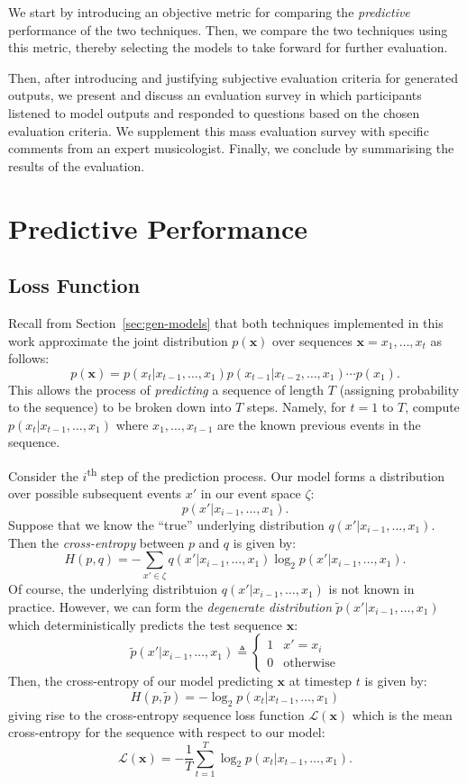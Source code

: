 \documentclass[12pt,a4paper,twoside,openright]{report}
\newcommand{\vect}[1]{\boldsymbol{\mathbf{#1}}}
\begin{document}
\vspace{4mm}

We start by introducing an objective metric for comparing the \emph{predictive}
performance of the two techniques. Then, we compare the two techniques using
this metric, thereby selecting the models to take forward for further
evaluation. 

Then, after introducing and justifying subjective evaluation criteria for
generated outputs, we present and discuss an evaluation survey in which
participants listened to model outputs and responded to questions based on the
chosen evaluation criteria. We supplement this mass evaluation survey with
specific comments from an expert musicologist. Finally, we conclude by
summarising the results of the evaluation.

\section{Predictive Performance}

\subsection{Loss Function}

Recall from Section~\ref{sec:gen-models} that both techniques implemented in
this work approximate the joint distribution $p(\vect{x})$ over sequences
$\vect{x} = x_1,\ldots,x_t$ as follows:
$$ p(\vect{x}) = p(x_t | x_{t-1}, \ldots, x_1) p(x_{t-1} | x_{t-2}, \ldots, x_1)
\cdots p(x_1). $$
This allows the process of \emph{predicting} a sequence of length $T$ (assigning
probability to the sequence) to be broken down into $T$ steps. Namely, for $t
= 1$ to $T$, compute $p(x_t | x_{t-1}, \ldots, x_1)$ where $x_1, \ldots,
x_{t-1}$ are the known previous events in the sequence. 

Consider the $i$\textsuperscript{th} step of the prediction process. Our model
forms a distribution over possible subsequent events $x'$ in our event space
$\zeta$:
$$ p(x' | x_{i-1}, \ldots, x_1). $$
Suppose that we know the ``true'' underlying distribution $q(x' |
x_{i-1}, \ldots, x_1)$. Then the \emph{cross-entropy} between $p$ and
$q$ is given by:
$$ H(p,q) = - \sum_{x' \in \zeta} q(x' | x_{i-1}, \ldots, x_1) \log_2{ p(x' |
x_{i-1}, \ldots, x_1)}. $$
Of course, the underlying distribtuion $q(x' | x_{i-1}, \ldots, x_1)$ is not
known in practice. However, we can form the \emph{degenerate distribution}
$\widetilde{p}(x' | x_{i-1}, \ldots, x_1)$ which deterministically predicts the
test sequence $\vect{x}$:
$$ \widetilde{p}(x' | x_{i-1}, \ldots, x_1) \triangleq \begin{cases}
  1 & x' = x_i \\
  0 & \text{otherwise}
\end{cases} $$
Then, the cross-entropy of our model predicting $\vect{x}$ at timestep $t$ is
given by: 
$$ H(p,\widetilde{p}) = - \log_2{ p(x_t | x_{t-1}, \ldots, x_1) } $$
giving rise to the cross-entropy sequence loss function
$\mathcal{L}(\vect{x})$
which is the mean cross-entropy for the sequence with respect to our model:
$$ \mathcal{L}(\vect{x}) = - \frac{1}{T} \sum_{t = 1}^T \log_2{ p(x_t | x_{t-1},
\ldots, x_1) }. $$
\end{document}
